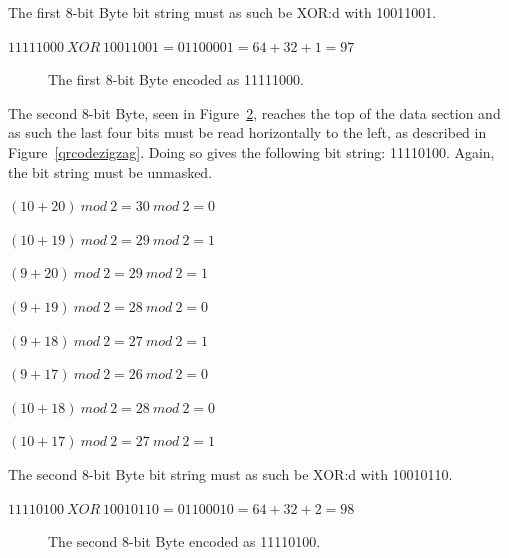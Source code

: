 The first 8-bit Byte bit string must as such be XOR:d with 10011001.

\begin{center}
\(11111000~XOR~10011001 = 01100001 = 64 + 32 + 1 = 97\)
\end{center}

	\begin{figure}[H]%
		\centering
		\caption{The first 8-bit Byte encoded as 11111000.}
		\label{qrcodeExampleStep6}
	\end{figure}

The second 8-bit Byte, seen in Figure~\ref{qrcodeExampleStep7}, reaches the top of the data section and as such the last four bits must be read horizontally to the left, as described in Figure~\ref{qrcodezigzag}. Doing so gives the following bit string: 11110100. Again, the bit string must be unmasked.

\begin{center}

\((10+20)~mod~2=30~mod~2=0\)

\((10+19)~mod~2=29~mod~2=1\)

\((9+20)~mod~2=29~mod~2=1\)

\((9+19)~mod~2=28~mod~2=0\)

\((9+18)~mod~2=27~mod~2=1\) 

\((9+17)~mod~2=26~mod~2=0\)

\((10+18)~mod~2=28~mod~2=0\)

\((10+17)~mod~2=27~mod~2=1\)

\end{center}

The second 8-bit Byte bit string must as such be XOR:d with 10010110.

\begin{center}
\(11110100~XOR~10010110 = 01100010 = 64 + 32 + 2 = 98\)
\end{center}

	\begin{figure}[H]%
		\centering
		\caption{The second 8-bit Byte encoded as 11110100.}
		\label{qrcodeExampleStep7}
	\end{figure}

